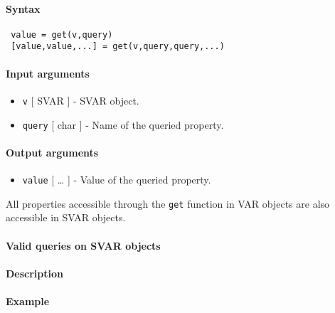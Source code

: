 


	\paragraph{Syntax}
 
 \begin{verbatim}
 value = get(v,query)
 [value,value,...] = get(v,query,query,...)
 \end{verbatim}
 
 \paragraph{Input arguments}
 
 \begin{itemize}
 \item
   \texttt{v} {[} SVAR {]} - SVAR object.
 \item
   \texttt{query} {[} char {]} - Name of the queried property.
 \end{itemize}
 
 \paragraph{Output arguments}
 
 \begin{itemize}
 \item
   \texttt{value} {[} \ldots{} {]} - Value of the queried property.
 \end{itemize}
 
 All properties accessible through the \texttt{get} function in VAR
 objects are also accessible in SVAR objects.
 
 \paragraph{Valid queries on SVAR objects}
 
 \paragraph{Description}
 
 \paragraph{Example}


